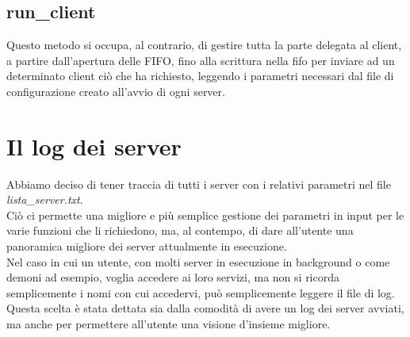 \documentclass[a4paper,9pt]{article}
\begin{document}
\subsection{run\_client}
Questo metodo si occupa, al contrario, di gestire tutta la parte delegata al client, a partire dall'apertura delle FIFO, fino alla scrittura nella fifo per inviare ad un determinato client ciò che ha richiesto, leggendo i parametri necessari dal file di configurazione creato all'avvio di ogni server.

\section{Il log dei server}
Abbiamo deciso di tener traccia di tutti i server con i relativi parametri nel file \emph{lista\_server.txt}.\\ 
Ciò ci permette una migliore e più semplice gestione dei parametri in input per le varie funzioni che li richiedono, ma, al contempo, di dare all'utente una panoramica migliore dei server attualmente in esecuzione.\\
Nel caso in cui un utente, con molti server in esecuzione in background o come demoni ad esempio, voglia accedere ai loro servizi, ma non si ricorda semplicemente i nomi con cui accedervi, può semplicemente leggere il file di log.\\
Questa scelta è stata dettata sia dalla comodità di avere un log dei server avviati, ma anche per permettere all'utente una visione d'insieme migliore.
\end{document}
